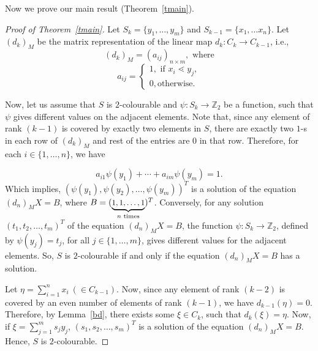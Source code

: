 \documentclass[12pt]{article}
\theoremstyle{definition}
\theoremstyle{remark}
\begin{document}
    
    Now we prove our main result (Theorem~\ref{tmain}). 
	\begin{proof}[Proof of Theorem~\ref{tmain}]
	    Let $S_k=\{y_1,\ldots, y_m\}$ and $S_{k-1}=\{x_1,\ldots x_n\}$. Let $(d_k)_M$ be the matrix representation of the linear map $d_k: C_k \rightarrow C_{k-1}$, i.e., 
	    \[(d_k)_M=(a_{ij})_{n\times m}, \text{ where}\]
	    \[a_{ij}=\begin{cases}
	    	1, \text{ if } x_i \lessdot y_j,\\
	    	0, \text{otherwise.}
	    \end{cases}\]
	 
	  
	    Now, let us assume that $S$ is $2$-colourable and $\psi: S_k \rightarrow \mathbb{Z}_2$ be a function, such that $\psi$ gives different values on the adjacent elements. Note that, since any element of rank $(k-1)$ is covered by exactly two elements in $S$, there are exactly two $1$-s in each row of $(d_k)_M$ and rest of the entries are $0$ in that row. Therefore, for each $i\in \{1,\ldots,n\}$, we have
	   
	    \[a_{i1}\psi(y_1)+\cdots+ a_{im}\psi(y_m)=1.\]
	    Which implies, $(\psi(y_1), \psi(y_2), \ldots , \psi(y_m))^T$ is a solution of the equation $(d_n)_M X= B$, where $B= (\small\underbrace{1,1,\ldots, 1}_{n \text{ times}})^T$. Conversely, for any solution $(t_1,t_2,\ldots, t_m)^T$ of the equation $(d_n)_M X= B$, the function $\psi: S_k\rightarrow \mathbb{Z}_2$, defined by $\psi(y_j)=t_j$, for all $j\in \{1,\ldots,m\}$, gives different values for the adjacent elements. So, $S$ is $2$-colourable if and only if the equation $(d_n)_M X= B$ has a solution.
	    
	    Let $\eta= \sum_{i=1}^n x_i~(\in C_{k-1})$. Now, since any element of rank $(k-2)$ is covered by an even number of elements of rank $(k-1)$, we have $d_{k-1}(\eta)=0$. Therefore, by Lemma~\ref{bd}, there exists some $\xi \in C_k$, such that $d_k(\xi)=\eta$. Now, if $\xi=\sum_{j=1}^m s_jy_j$, $(s_1,s_2,\ldots,s_m)^T$ is a solution of the equation $(d_n)_M X= B$. Hence, $S$ is $2$-colourable.
	    \end{proof}
	    
\end{document}
